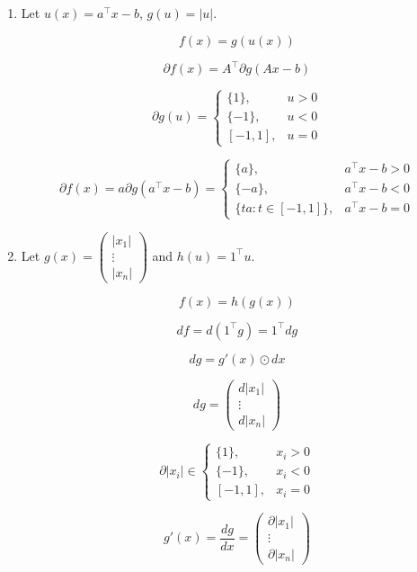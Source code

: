 \documentclass[11pt,a4paper]{article}
\begin{document}
\begin{enumerate}
    \item

    Let $u(x) = a^\top x - b$, $g(u) = \vert u \vert$.

    $$
    f(x) = g(u(x))
    $$
    
    $$
    \partial f(x) = A^\top \partial g(Ax - b)
    $$

    $$
    \partial g(u)
    =
    \begin{cases}
        \{1\}, & u > 0 \\
        \{-1\}, & u < 0 \\
        [-1, 1], & u = 0
    \end{cases}
    $$

    $$
    \partial f(x)
    = a \partial g(a^\top x - b)
    =
    \begin{cases}
        \{a\}, & a^\top x - b > 0 \\
        \{-a\}, & a^\top x - b < 0 \\
        \{t a : t \in [-1, 1]\}, & a^\top x - b = 0
    \end{cases}
    $$

    \item

    Let $g(x) = \begin{pmatrix} \vert x_1 \vert \\ \vdots \\ \vert x_n \vert \end{pmatrix}$ and $h(u) = 1^\top u$.

    $$
    f(x) = h(g(x))
    $$

    $$
    d f = d (1^\top g) = 1^\top d g
    $$

    $$
    d g =  g'(x) \odot dx
    $$

    $$
    d g
    =
    \begin{pmatrix}
        d \vert x_1 \vert \\
        \vdots \\
        d \vert x_n \vert
    \end{pmatrix}
    $$

    $$
    \partial \vert x_i \vert \in
    \begin{cases}
        \{1\}, & x_i > 0 \\
        \{-1\}, & x_i < 0 \\
        [-1, 1], & x_i = 0
    \end{cases}
    $$

    $$
    g'(x) = \frac{d g}{d x} =
    \begin{pmatrix}
        \partial \vert x_1 \vert \\
        \vdots \\
        \partial \vert x_n \vert
    \end{pmatrix}
    $$


\end{enumerate}
\end{document}
